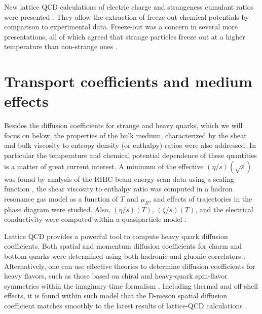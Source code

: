 \documentclass{webofc}
\begin{document}
New lattice QCD calculations of electric charge and strangeness cumulant ratios were presented \cite{Bollweg:2020pjb}. They allow the extraction of freeze-out chemical potentials by comparison to experimental data.
Freeze-out was a concern in several more presentations, all of which agreed that strange particles freeze out at a higher temperature than non-strange ones \cite{Alba:2020jir, Inghirami:2021zja, Chen:2020zuw}.

\section{Transport coefficients and medium effects}
\label{sec-transport}

Besides the diffusion coefficients for strange and heavy quarks, which we will focus on below, the properties of the bulk medium, characterized by the shear and bulk viscosity to entropy density (or enthalpy) ratios were also addressed. In particular the temperature and chemical potential dependence of these quantities is a matter of great current interest. A minimum of the effective $(\eta/s)(\sqrt{s})$ was found by analysis of the RHIC beam energy scan data using a scaling function \cite{lacey}, the shear viscosity to enthalpy ratio was computed in a hadron resonance gas model \cite{McLaughlin:2021dph} as a function of $T$ and $\mu_B$, and effects of trajectories in the phase diagram were studied. Also, $(\eta/s)(T)$, $(\zeta/s)(T)$, and the electrical conductivity were computed within a quasiparticle model \cite{Mykhaylova:2020pfk}.

Lattice QCD provides a powerful tool to compute heavy quark diffusion coefficients. Both spatial and momentum diffusion coefficients for charm and bottom quarks were determined using both hadronic and gluonic correlators \cite{Ding:2018uhl,Altenkort:2020fgs}. 
Alternatively, one can use effective theories to determine diffusion coefficients for heavy flavors, such as those based on chiral and heavy-quark spin-flavor symmetries within the imaginary-time formalism \cite{Montana:2020lfi}. Including thermal and off-shell effects, it is found within such model that the D-meson spatial diffusion coefficient matches smoothly to the latest results of lattice-QCD calculations \cite{Torres-Rincon:2021yga}.
\end{document}
